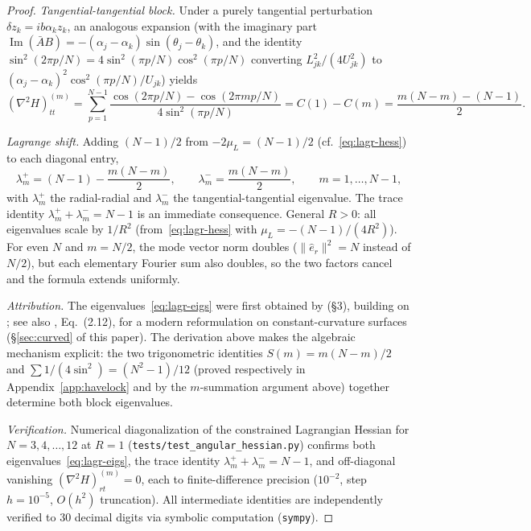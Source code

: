 \begin{proof}
\emph{Tangential-tangential block.}
Under a purely tangential perturbation $\delta z_k = ib\alpha_k z_k$,
an analogous expansion (with the imaginary part $\operatorname{Im}(\bar A B)
= -(\alpha_j - \alpha_k)\sin(\theta_j - \theta_k)$, and the
identity $\sin^2(2\pi p/N) = 4\sin^2(\pi p/N)\cos^2(\pi p/N)$
converting $L_{jk}^2/(4U_{jk}^2)$ to
$(\alpha_j - \alpha_k)^2\cos^2(\pi p/N)/U_{jk}$) yields
\[
  (\nabla^2 H)_{tt}^{(m)}
   = \sum_{p=1}^{N-1}\frac{\cos(2\pi p/N) - \cos(2\pi mp/N)}{4\sin^2(\pi p/N)}
   = C(1) - C(m)
   = \frac{m(N{-}m) - (N{-}1)}{2}.
\]

\emph{Lagrange shift.}
Adding $(N{-}1)/2$ from $-2\mu_L = (N{-}1)/2$
(cf.~\eqref{eq:lagr-hess}) to each diagonal entry,
\begin{equation}\label{eq:lagr-eigs}
  \lambda_m^+ = (N-1) - \frac{m(N-m)}{2},
  \qquad
  \lambda_m^- = \frac{m(N-m)}{2},
  \qquad m = 1, \ldots, N-1,
\end{equation}
with $\lambda_m^+$ the radial-radial and $\lambda_m^-$ the
tangential-tangential eigenvalue. The trace identity
$\lambda_m^+ + \lambda_m^- = N - 1$ is an immediate consequence.
General $R > 0$: all eigenvalues scale by $1/R^2$
(from~\eqref{eq:lagr-hess} with $\mu_L = -(N{-}1)/(4R^2)$).
For even $N$ and $m = N/2$, the mode vector norm doubles
($\|\hat e_r\|^2 = N$ instead of $N/2$), but each elementary
Fourier sum also doubles, so the two factors cancel and the formula
extends uniformly.

\emph{Attribution.}
The eigenvalues~\eqref{eq:lagr-eigs} were first obtained by
\citet{Havelock1931} (\S3), building on \citet{Thomson1883};
see also \citet{BoattoCabral2003}, Eq.~(2.12), for a modern
reformulation on constant-curvature surfaces
(\S\ref{sec:curved} of this paper).
The derivation above makes the algebraic mechanism explicit: the
two trigonometric identities $S(m) = m(N{-}m)/2$ and
$\sum 1/(4\sin^2) = (N^2{-}1)/12$ (proved respectively in
Appendix~\ref{app:havelock} and by the $m$-summation argument above)
together determine both block eigenvalues.

\emph{Verification.}
Numerical diagonalization of the constrained Lagrangian
Hessian for $N = 3, 4, \ldots, 12$ at $R = 1$
(\texttt{tests/test\_angular\_hessian.py}) confirms both
eigenvalues~\eqref{eq:lagr-eigs}, the trace identity
$\lambda_m^+ + \lambda_m^- = N{-}1$, and off-diagonal vanishing
$(\nabla^2 H)_{rt}^{(m)} = 0$, each to finite-difference
precision ($10^{-2}$, step $h = 10^{-5}$, $O(h^2)$ truncation).
All intermediate identities are independently verified to 30
decimal digits via symbolic computation (\texttt{sympy}).


\end{proof}
